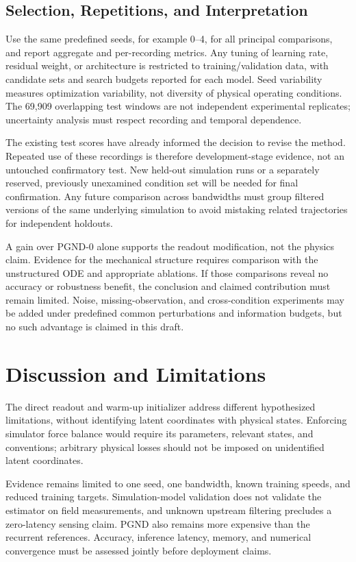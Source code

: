 \documentclass[journal,twoside]{IEEEtran}
\begin{document}
\subsection{Selection, Repetitions, and Interpretation}
Use the same predefined seeds, for example 0--4, for all principal
comparisons, and report aggregate and per-recording metrics. Any tuning
of learning rate, residual weight, or architecture is restricted to
training/validation data, with candidate sets and search budgets reported
for each model. Seed variability measures optimization variability, not
diversity of physical operating conditions. The 69,909 overlapping test
windows are not independent experimental replicates; uncertainty analysis
must respect recording and temporal dependence.

The existing test scores have already informed the decision to revise the
method. Repeated use of these recordings is therefore development-stage
evidence, not an untouched confirmatory test. New held-out simulation runs
or a separately reserved, previously unexamined condition set will be
needed for final confirmation. Any future comparison across bandwidths
must group filtered versions of the same underlying simulation to avoid
mistaking related trajectories for independent holdouts.

A gain over PGND-0 alone supports the readout modification, not the physics
claim. Evidence for the mechanical structure requires comparison with the
unstructured ODE and appropriate ablations. If those comparisons reveal
no accuracy or robustness benefit, the conclusion and claimed contribution
must remain limited. Noise, missing-observation, and cross-condition
experiments may be added under predefined common perturbations and
information budgets, but no such advantage is claimed in this draft.

\section{Discussion and Limitations}
The direct readout and warm-up initializer address different hypothesized
limitations, without identifying latent coordinates with physical states.
Enforcing simulator force balance would require its parameters, relevant
states, and conventions; arbitrary physical losses should not be imposed
on unidentified latent coordinates.

Evidence remains limited to one seed, one bandwidth, known training speeds,
and reduced training targets. Simulation-model validation does not validate
the estimator on field measurements, and unknown upstream filtering
precludes a zero-latency sensing claim. PGND also remains more expensive
than the recurrent references. Accuracy, inference latency, memory, and
numerical convergence must be assessed jointly before deployment claims.
\end{document}

